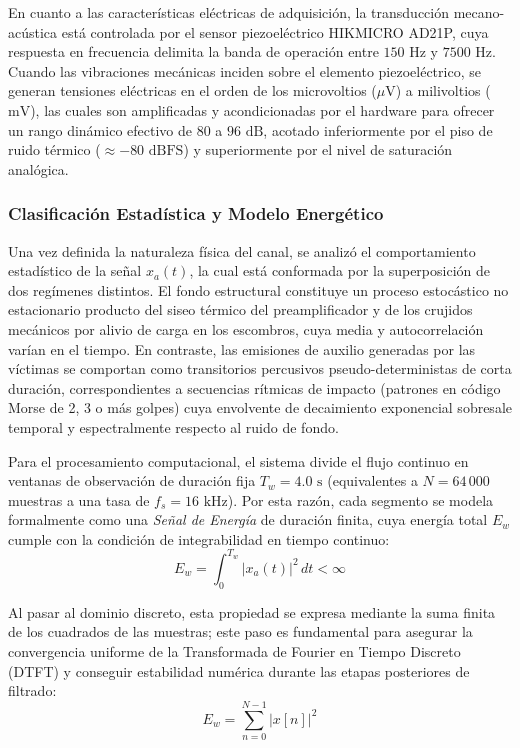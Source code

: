 \documentclass[11pt, a4paper]{article}
\begin{document}
En cuanto a las características eléctricas de adquisición, la transducción mecano-acústica está controlada por el sensor piezoeléctrico HIKMICRO AD21P, cuya respuesta en frecuencia delimita la banda de operación entre $150\text{ Hz}$ y $7500\text{ Hz}$. Cuando las vibraciones mecánicas inciden sobre el elemento piezoeléctrico, se generan tensiones eléctricas en el orden de los microvoltios ($\mu\text{V}$) a milivoltios ($\text{mV}$), las cuales son amplificadas y acondicionadas por el hardware para ofrecer un rango dinámico efectivo de $80$ a $96\text{ dB}$, acotado inferiormente por el piso de ruido térmico ($\approx -80\text{ dBFS}$) y superiormente por el nivel de saturación analógica.

\subsubsection{Clasificación Estadística y Modelo Energético}
Una vez definida la naturaleza física del canal, se analizó el comportamiento estadístico de la señal $x_a(t)$, la cual está conformada por la superposición de dos regímenes distintos. El fondo estructural constituye un proceso estocástico no estacionario producto del siseo térmico del preamplificador y de los crujidos mecánicos por alivio de carga en los escombros, cuya media y autocorrelación varían en el tiempo. En contraste, las emisiones de auxilio generadas por las víctimas se comportan como transitorios percusivos pseudo-deterministas de corta duración, correspondientes a secuencias rítmicas de impacto (patrones en código Morse de 2, 3 o más golpes) cuya envolvente de decaimiento exponencial sobresale temporal y espectralmente respecto al ruido de fondo.

Para el procesamiento computacional, el sistema divide el flujo continuo en ventanas de observación de duración fija $T_w = 4.0\text{ s}$ (equivalentes a $N = 64\,000$ muestras a una tasa de $f_s = 16\text{ kHz}$). Por esta razón, cada segmento se modela formalmente como una \textit{Señal de Energía} de duración finita, cuya energía total $E_w$ cumple con la condición de integrabilidad en tiempo continuo:
\begin{equation}
    E_w = \int_0^{T_w} |x_a(t)|^2 \, dt < \infty
\end{equation}

Al pasar al dominio discreto, esta propiedad se expresa mediante la suma finita de los cuadrados de las muestras; este paso es fundamental para asegurar la convergencia uniforme de la Transformada de Fourier en Tiempo Discreto (DTFT) y conseguir estabilidad numérica durante las etapas posteriores de filtrado:
\begin{equation}
    E_w = \sum_{n=0}^{N-1} |x[n]|^2
\end{equation}
\end{document}
